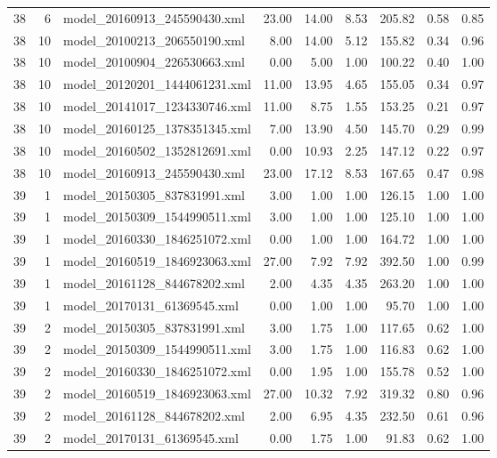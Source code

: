 \begin{table}[ht]
\begin{tabular}{rrlrrrrrr}
   38 &   6 & model\_20160913\_245590430.xml & 23.00 & 14.00 & 8.53 & 205.82 & 0.58 & 0.85 \\ 
   38 &  10 & model\_20100213\_206550190.xml & 8.00 & 14.00 & 5.12 & 155.82 & 0.34 & 0.96 \\ 
   38 &  10 & model\_20100904\_226530663.xml & 0.00 & 5.00 & 1.00 & 100.22 & 0.40 & 1.00 \\ 
   38 &  10 & model\_20120201\_1444061231.xml & 11.00 & 13.95 & 4.65 & 155.05 & 0.34 & 0.97 \\ 
   38 &  10 & model\_20141017\_1234330746.xml & 11.00 & 8.75 & 1.55 & 153.25 & 0.21 & 0.97 \\ 
   38 &  10 & model\_20160125\_1378351345.xml & 7.00 & 13.90 & 4.50 & 145.70 & 0.29 & 0.99 \\ 
   38 &  10 & model\_20160502\_1352812691.xml & 0.00 & 10.93 & 2.25 & 147.12 & 0.22 & 0.97 \\ 
   38 &  10 & model\_20160913\_245590430.xml & 23.00 & 17.12 & 8.53 & 167.65 & 0.47 & 0.98 \\ 
   39 &   1 & model\_20150305\_837831991.xml & 3.00 & 1.00 & 1.00 & 126.15 & 1.00 & 1.00 \\ 
   39 &   1 & model\_20150309\_1544990511.xml & 3.00 & 1.00 & 1.00 & 125.10 & 1.00 & 1.00 \\ 
   39 &   1 & model\_20160330\_1846251072.xml & 0.00 & 1.00 & 1.00 & 164.72 & 1.00 & 1.00 \\ 
   39 &   1 & model\_20160519\_1846923063.xml & 27.00 & 7.92 & 7.92 & 392.50 & 1.00 & 0.99 \\ 
   39 &   1 & model\_20161128\_844678202.xml & 2.00 & 4.35 & 4.35 & 263.20 & 1.00 & 1.00 \\ 
   39 &   1 & model\_20170131\_61369545.xml & 0.00 & 1.00 & 1.00 & 95.70 & 1.00 & 1.00 \\ 
   39 &   2 & model\_20150305\_837831991.xml & 3.00 & 1.75 & 1.00 & 117.65 & 0.62 & 1.00 \\ 
   39 &   2 & model\_20150309\_1544990511.xml & 3.00 & 1.75 & 1.00 & 116.83 & 0.62 & 1.00 \\ 
   39 &   2 & model\_20160330\_1846251072.xml & 0.00 & 1.95 & 1.00 & 155.78 & 0.52 & 1.00 \\ 
   39 &   2 & model\_20160519\_1846923063.xml & 27.00 & 10.32 & 7.92 & 319.32 & 0.80 & 0.96 \\ 
   39 &   2 & model\_20161128\_844678202.xml & 2.00 & 6.95 & 4.35 & 232.50 & 0.61 & 0.96 \\ 
   39 &   2 & model\_20170131\_61369545.xml & 0.00 & 1.75 & 1.00 & 91.83 & 0.62 & 1.00 \\ 

\end{tabular}
\end{table}

